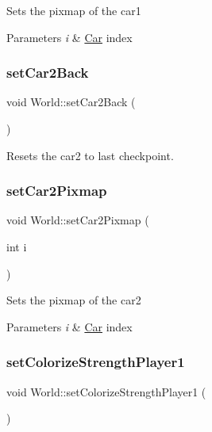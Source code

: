 Sets the pixmap of the car1 
\begin{DoxyParams}{Parameters}
{\em i} & \mbox{\hyperlink{class_car}{Car}} index \\
\hline
\end{DoxyParams}
\mbox{\label{class_world_a57267831b353e52db5c3104dfa809015}} 
\subsubsection{\texorpdfstring{setCar2Back}{setCar2Back}}
{\footnotesize\ttfamily void World\+::set\+Car2\+Back (\begin{DoxyParamCaption}{ }\end{DoxyParamCaption})\hspace{0.3cm}{\ttfamily [signal]}}



Resets the car2 to last checkpoint. 

\mbox{\label{class_world_a9fdd7ce2f9ff959732c68417ba01cf16}} 
\subsubsection{\texorpdfstring{setCar2Pixmap}{setCar2Pixmap}}
{\footnotesize\ttfamily void World\+::set\+Car2\+Pixmap (\begin{DoxyParamCaption}\item[{int}]{i }\end{DoxyParamCaption})\hspace{0.3cm}{\ttfamily [signal]}}

Sets the pixmap of the car2 
\begin{DoxyParams}{Parameters}
{\em i} & \mbox{\hyperlink{class_car}{Car}} index \\
\hline
\end{DoxyParams}
\mbox{\label{class_world_a493703c5c33d963cf7580c027038874d}} 
\subsubsection{\texorpdfstring{setColorizeStrengthPlayer1}{setColorizeStrengthPlayer1}}
{\footnotesize\ttfamily void World\+::set\+Colorize\+Strength\+Player1 (\begin{DoxyParamCaption}{ }\end{DoxyParamCaption})\hspace{0.3cm}{\ttfamily [slot]}}



